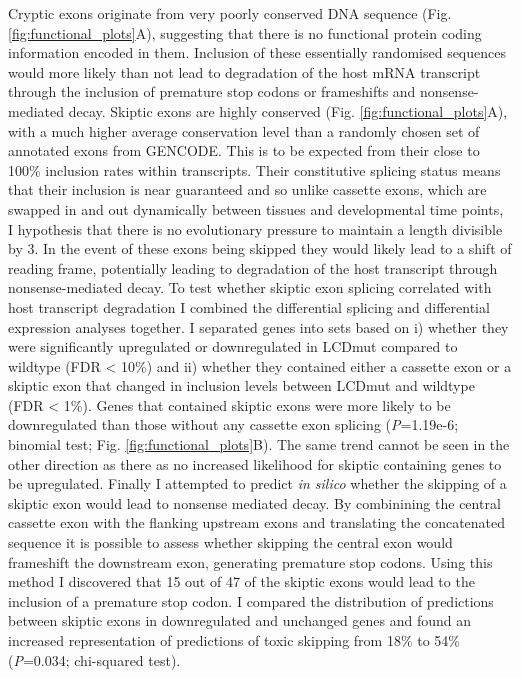 Cryptic exons originate from very poorly conserved DNA sequence  (Fig. \ref{fig:functional_plots}A), suggesting that there is no functional protein coding information encoded in them. 
Inclusion of these essentially randomised sequences would more likely than not lead to degradation of the host mRNA transcript through the inclusion of premature stop codons or frameshifts and nonsense-mediated decay.
Skiptic exons are highly conserved (Fig. \ref{fig:functional_plots}A), with a much higher average conservation level than a randomly chosen set of annotated exons from GENCODE.  
This is to be expected from their close to 100\% inclusion rates within transcripts. 
Their constitutive splicing status means that their inclusion is near guaranteed and so unlike cassette exons, which are swapped in and out dynamically between tissues and developmental time points, I hypothesis that there is no evolutionary pressure to maintain a length divisible by 3. 
In the event of these exons being skipped they would likely lead to a shift of reading frame, potentially leading to degradation of the host transcript through nonsense-mediated decay.
 To test whether skiptic exon splicing correlated with host transcript degradation I combined the differential splicing and differential expression analyses together. I separated genes into sets based on i) whether they were significantly upregulated or downregulated in LCDmut compared to wildtype (FDR < 10\%) and ii) whether they contained either a cassette exon or a skiptic exon that changed in inclusion levels between LCDmut and wildtype (FDR < 1\%). 
 Genes that contained skiptic exons were more likely to be downregulated than those without any cassette exon splicing  (\textit{P}=1.19e-6; binomial test; Fig. \ref{fig:functional_plots}B). The same trend cannot be seen in the other direction as there as no increased likelihood for skiptic containing genes to be upregulated. 
 Finally I attempted to predict \textit{in silico} whether the skipping of a skiptic exon would lead to nonsense mediated decay. 
 By combinining the central cassette exon with the flanking upstream exons and translating the concatenated sequence it is possible to assess whether skipping the central exon would frameshift the downstream exon, generating premature stop codons. 
 Using this method I discovered that 15 out of 47 of the skiptic exons would lead to the inclusion of a premature stop codon.  
I compared the distribution of predictions between skiptic exons in downregulated and unchanged genes and found an increased representation of predictions of toxic skipping from 18\% to 54\% (\textit{P}=0.034; chi-squared test). 

